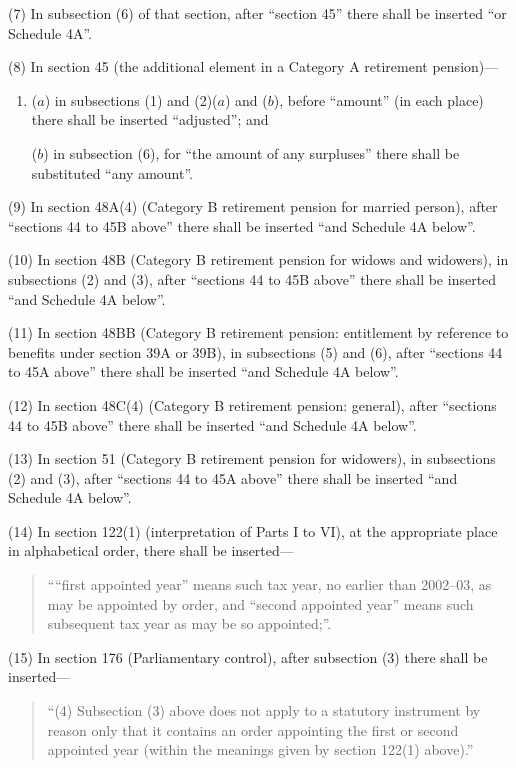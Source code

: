 \documentclass[12pt,a4paper]{article}
\begin{document}
(7) In subsection (6)  of that section, after “section 45” there shall be inserted “or Schedule 4A”.

(8) In section 45 (the additional element in a Category A retirement pension)—
\begin{enumerate}\item[]
($a$) in subsections (1)  and (2)($a$)  and ($b$), before “amount” (in each place) there shall be inserted “adjusted”; and

($b$) in subsection (6), for “the amount of any surpluses” there shall be substituted “any amount”.
\end{enumerate}

(9) In section 48A(4)  (Category B retirement pension for married person), after “sections 44 to 45B above” there shall be inserted “and Schedule 4A below”.

(10) In section 48B (Category B retirement pension for widows and widowers), in subsections (2)  and (3), after “sections 44 to 45B above” there shall be inserted “and Schedule 4A below”.

(11) In section 48BB (Category B retirement pension: entitlement by reference to benefits under section 39A or 39B), in subsections (5)  and (6), after “sections 44 to 45A above” there shall be inserted “and Schedule 4A below”.

(12) In section 48C(4)  (Category B retirement pension: general), after “sections 44 to 45B above” there shall be inserted “and Schedule 4A below”.

(13) In section 51 (Category B retirement pension for widowers), in subsections (2)  and (3), after “sections 44 to 45A above” there shall be inserted “and Schedule 4A below”.

(14) In section 122(1)  (interpretation of Parts I to VI), at the appropriate place in alphabetical order, there shall be inserted—
\begin{quotation}
““first appointed year” means such tax year, no earlier than 2002--03, as may be appointed by order, and “second appointed year” means such subsequent tax year as may be so appointed;”.
\end{quotation}

(15) In section 176 (Parliamentary control), after subsection (3)  there shall be inserted—
\begin{quotation}
“(4) Subsection (3)  above does not apply to a statutory instrument by reason only that it contains an order appointing the first or second appointed year (within the meanings given by section 122(1)  above).”
\end{quotation}
\end{document}
